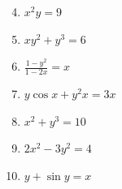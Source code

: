 \documentclass[12pt]{article}
\newif\ifans
\begin{document}

\begin{enumerate}
\setcounter{enumi}{3}

\item $x^2y=9$ 

\ifans{\fbox{$\frac{dy}{dx}=\frac{-2y}{x}$}} \fi

\item $xy^2+y^3 = 6$ 

\ifans{\fbox{$\frac{dy}{dx}=\frac{-y}{2x+3y}$}} \fi

\item $\frac{1-y^2}{1-2x}=x$ 

\ifans{\fbox{$\frac{dy}{dx}=\frac{4x-1}{2y}$}} \fi

\item $y\cos{x} + y^2x = 3x$ 

\ifans{\fbox{$\frac{dy}{dx}=\frac{3-y^2+y\sin{x}}{2xy+\cos{x}}$}} \fi

\item $x^2+y^3=10$ 

\ifans{\fbox{$\frac{dy}{dx}=\frac{-2x}{3y^2}$}} \fi

\end{enumerate}


\begin{enumerate}
\setcounter{enumi}{8}

\item $2x^2-3y^2=4$

\ifans{\fbox{$\frac{d^2y}{dx^2}=-\frac{8}{9y^3}$}} \fi

\item $y+\sin{y}=x$

\ifans{\fbox{$\frac{d^2y}{dx^2}=\frac{\sin{y}}{(1+\cos{y})^3}$}} \fi

\end{enumerate}

\end{document}

